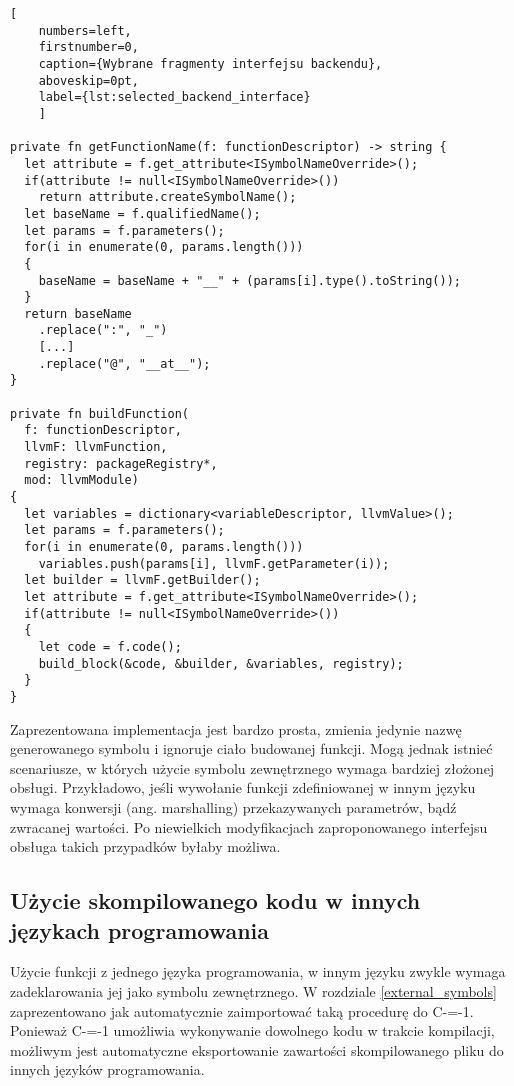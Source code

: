 \begin{minipage}{\linewidth}
  
  \begin{lstlisting}[
    numbers=left,
    firstnumber=0,
    caption={Wybrane fragmenty interfejsu backendu},
    aboveskip=0pt,
    label={lst:selected_backend_interface}
    ]

private fn getFunctionName(f: functionDescriptor) -> string {
  let attribute = f.get_attribute<ISymbolNameOverride>();
  if(attribute != null<ISymbolNameOverride>())
    return attribute.createSymbolName();
  let baseName = f.qualifiedName();
  let params = f.parameters();
  for(i in enumerate(0, params.length()))
  {
    baseName = baseName + "__" + (params[i].type().toString());
  }
  return baseName
    .replace(":", "_")
    [...]
    .replace("@", "__at__");
}

private fn buildFunction(
  f: functionDescriptor,
  llvmF: llvmFunction,
  registry: packageRegistry*,
  mod: llvmModule)
{
  let variables = dictionary<variableDescriptor, llvmValue>();
  let params = f.parameters();
  for(i in enumerate(0, params.length()))
    variables.push(params[i], llvmF.getParameter(i));
  let builder = llvmF.getBuilder();
  let attribute = f.get_attribute<ISymbolNameOverride>();
  if(attribute != null<ISymbolNameOverride>())
  {
    let code = f.code();
    build_block(&code, &builder, &variables, registry);
  }
}

\end{lstlisting}
\end{minipage}

Zaprezentowana implementacja jest bardzo prosta, zmienia jedynie nazwę generowanego symbolu i ignoruje ciało budowanej funkcji.
Mogą jednak istnieć scenariusze, w których użycie symbolu zewnętrznego wymaga bardziej złożonej obsługi.
Przykładowo, jeśli wywołanie funkcji zdefiniowanej w innym języku wymaga konwersji (ang. marshalling) przekazywanych parametrów, bądź zwracanej wartości.
Po niewielkich modyfikacjach zaproponowanego interfejsu obsługa takich przypadków byłaby możliwa.

\subsection{Użycie skompilowanego kodu w innych językach programowania}
\label{comparison:exporting_to_other_languages}

Użycie funkcji z jednego języka programowania, w innym języku zwykle wymaga zadeklarowania jej jako symbolu zewnętrznego.
W rozdziale \ref{external_symbols} zaprezentowano jak automatycznie zaimportować taką procedurę do C-=-1.
Ponieważ C-=-1 umożliwia wykonywanie dowolnego kodu w trakcie kompilacji, możliwym jest automatyczne eksportowanie zawartości skompilowanego pliku do innych języków programowania.

